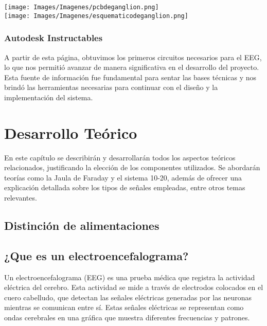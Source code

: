 \documentclass{article}
\begin{document}
\begin{center}
    \texttt{[image: Images/Imagenes/pcbdeganglion.png]}\\

    \texttt{[image: Images/Imagenes/esquematicodeganglion.png]}\\
\end {center}

\subsubsection{Autodesk Instructables}
A partir de esta página, obtuvimos los primeros circuitos necesarios para el EEG, lo que nos permitió avanzar de manera significativa en el desarrollo del proyecto. Esta fuente de información fue fundamental para sentar las bases técnicas y nos brindó las herramientas necesarias para continuar con el diseño y la implementación del sistema.

\section{Desarrollo Teórico}
En este capítulo se describirán y desarrollarán todos los aspectos teóricos relacionados, justificando la elección de los componentes utilizados. Se abordarán teorías como la Jaula de Faraday y el sistema 10-20, además de ofrecer una explicación detallada sobre los tipos de señales empleadas, entre otros temas relevantes.

\subsection{Distinción de alimentaciones}

\subsection{¿Que es un electroencefalograma?}

Un electroencefalograma (EEG) es una prueba médica que registra la actividad eléctrica del cerebro. Esta actividad se mide a través de electrodos colocados en el cuero cabelludo, que detectan las señales eléctricas generadas por las neuronas mientras se comunican entre sí. Estas señales eléctricas se representan como ondas cerebrales en una gráfica que muestra diferentes frecuencias y patrones.
\end{document}
